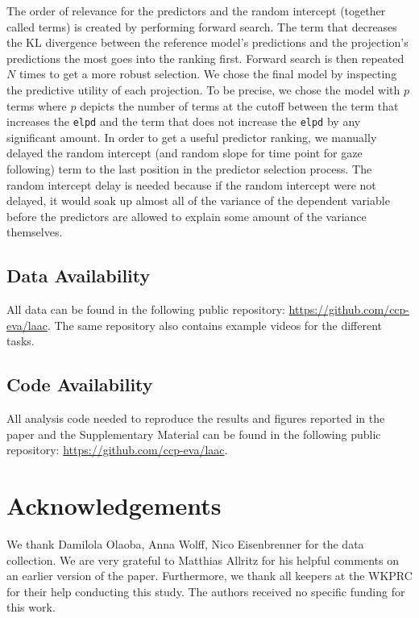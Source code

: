 \documentclass[
  man,floatsintext]{apa6}
\begin{document}
The order of relevance for the predictors and the random intercept (together called terms) is created by performing forward search. The term that decreases the KL divergence between the reference model's predictions and the projection's predictions the most goes into the ranking first. Forward search is then repeated \(N\) times to get a more robust selection. We chose the final model by inspecting the predictive utility of each projection. To be precise, we chose the model with \(p\) terms where \(p\) depicts the number of terms at the cutoff between the term that increases the \texttt{elpd} and the term that does not increase the \texttt{elpd} by any significant amount. In order to get a useful predictor ranking, we manually delayed the random intercept (and random slope for time point for gaze following) term to the last position in the predictor selection process. The random intercept delay is needed because if the random intercept were not delayed, it would soak up almost all of the variance of the dependent variable before the predictors are allowed to explain some amount of the variance themselves.

\hypertarget{data-availability}{%
\subsection{Data Availability}\label{data-availability}}

All data can be found in the following public repository: \url{https://github.com/ccp-eva/laac}. The same repository also contains example videos for the different tasks.

\hypertarget{code-availability}{%
\subsection{Code Availability}\label{code-availability}}

All analysis code needed to reproduce the results and figures reported in the paper and the Supplementary Material can be found in the following public repository: \url{https://github.com/ccp-eva/laac}.

\hypertarget{acknowledgements}{%
\section{Acknowledgements}\label{acknowledgements}}

We thank Damilola Olaoba, Anna Wolff, Nico Eisenbrenner for the data collection. We are very grateful to Matthias Allritz for his helpful comments on an earlier version of the paper. Furthermore, we thank all keepers at the WKPRC for their help conducting this study. The authors received no specific funding for this work.
\end{document}
